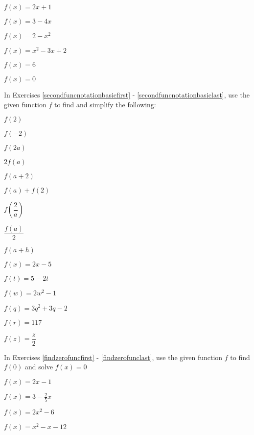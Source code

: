 \begin{shortexenum}
\item $f(x) = 2x+1$ \label{funcnotationbasicfirst} 
\item $f(x) = 3 - 4x$
\item $f(x) = 2 - x^2$
\item $f(x) = x^2 - 3x + 2$
\item $f(x) = 6$
\item $f(x) = 0$ \label{funcnotationbasiclast}
\end{shortexenum}

In Exercises \ref{secondfuncnotationbasicfirst} - \ref{secondfuncnotationbasiclast}, use the given function $f$ to find and simplify the following:

\begin{shortitemize}
\item  $f(2)$
\item  $f(-2)$
\item  $f(2a)$
\item  $2 f(a)$
\item $f(a+2)$
\item $f(a) + f(2)$
\item  $f \left( \dfrac{2}{a} \right)$
\item $\dfrac{f(a)}{2}$
\item  $f(a + h)$
\end{shortitemize}

\begin{shortexenum}[$f(q) = 3q^2+3q-2$]
\item $f(x) = 2x-5$ \label{secondfuncnotationbasicfirst}
\item $f(t) = 5-2t$
\item $f(w) = 2w^2 - 1$
\item $f(q) = 3q^2+3q-2$
\item $f(r) = 117$
\item $f(z) = \dfrac{z}{2}$  \label{secondfuncnotationbasiclast}
\end{shortexenum}

In Exercises \ref{findzerofuncfirst} - \ref{findzerofunclast}, use the given function $f$ to find $f(0)$ and solve $f(x) = 0$

\begin{shortexenum}[$f(x) = x^2 - x - 12$]
\item $f(x) = 2x - 1$ \label{findzerofuncfirst}
\item $f(x) = 3 - \frac{2}{5} x$
\item $f(x) = 2x^2 - 6$
\item $f(x) = x^2 - x - 12$ \label{findzerofunclast}
\end{shortexenum}


